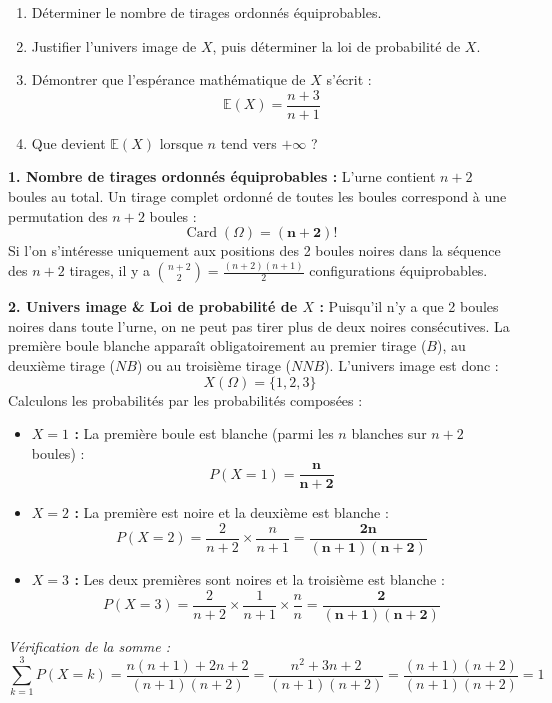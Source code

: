 \documentclass[11pt,a4paper]{article}
\newcommand{\E}{\mathbb{E}}
\begin{document}
\begin{enumerate}[label=\arabic*.]
    \item Déterminer le nombre de tirages ordonnés équiprobables.
    \item Justifier l'univers image de $X$, puis déterminer la loi de probabilité de $X$.
    \item Démontrer que l'espérance mathématique de $X$ s'écrit :
    \[
    \E(X) = \frac{n + 3}{n + 1}
    \]
    \item Que devient $\E(X)$ lorsque $n$ tend vers $+\infty$ ?
\end{enumerate}

\begin{correctionbox}
\textbf{1. Nombre de tirages ordonnés équiprobables :}
L'urne contient $n + 2$ boules au total. Un tirage complet ordonné de toutes les boules correspond à une permutation des $n + 2$ boules :
\[
\operatorname{Card}(\Omega) = \mathbf{(n + 2)!}
\]
Si l'on s'intéresse uniquement aux positions des 2 boules noires dans la séquence des $n + 2$ tirages, il y a $\binom{n+2}{2} = \frac{(n+2)(n+1)}{2}$ configurations équiprobables.

\textbf{2. Univers image \& Loi de probabilité de $X$ :}
Puisqu'il n'y a que 2 boules noires dans toute l'urne, on ne peut pas tirer plus de deux noires consécutives.
La première boule blanche apparaît obligatoirement au premier tirage ($B$), au deuxième tirage ($NB$) ou au troisième tirage ($NNB$).
L'univers image est donc :
\[
X(\Omega) = \{1, 2, 3\}
\]
Calculons les probabilités par les probabilités composées :
\begin{itemize}[label=$\bullet$]
    \item \textbf{$X = 1$ :} La première boule est blanche (parmi les $n$ blanches sur $n+2$ boules) :
    \[
    P(X = 1) = \mathbf{\frac{n}{n + 2}}
    \]
    \item \textbf{$X = 2$ :} La première est noire et la deuxième est blanche :
    \[
    P(X = 2) = \frac{2}{n + 2} \times \frac{n}{n + 1} = \mathbf{\frac{2n}{(n + 1)(n + 2)}}
    \]
    \item \textbf{$X = 3$ :} Les deux premières sont noires et la troisième est blanche :
    \[
    P(X = 3) = \frac{2}{n + 2} \times \frac{1}{n + 1} \times \frac{n}{n} = \mathbf{\frac{2}{(n + 1)(n + 2)}}
    \]
\end{itemize}
\emph{Vérification de la somme :}
\[
\sum_{k=1}^3 P(X = k) = \frac{n(n + 1) + 2n + 2}{(n + 1)(n + 2)} = \frac{n^2 + 3n + 2}{(n + 1)(n + 2)} = \frac{(n + 1)(n + 2)}{(n + 1)(n + 2)} = 1
\]


\end{correctionbox}
\end{document}
